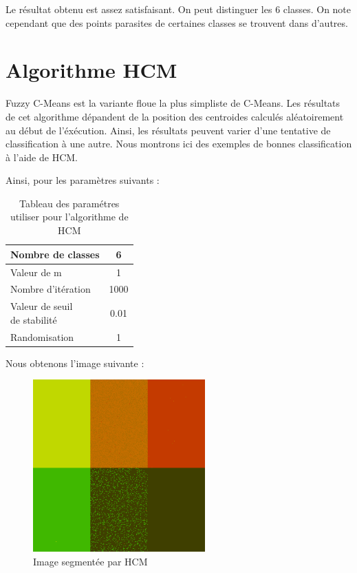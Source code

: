 \documentclass[a4paper,11pt]{article}
\begin{document}
Le résultat obtenu est assez satisfaisant. On peut distinguer les 6 classes. On note cependant que des points parasites de certaines classes se trouvent dans d'autres.

\section{Algorithme HCM}
Fuzzy C-Means est la variante floue la plus simpliste de C-Means. Les résultats de cet algorithme dépandent de la position des centroides calculés aléatoirement au début de l'éxécution. Ainsi, les résultats peuvent varier d'une tentative de classification à une autre. Nous montrons ici des exemples de bonnes classification à l'aide de HCM.

Ainsi, pour les paramètres suivants : 

\begin{table}[H]
  \begin{center}
    \begin{tabular}{|l|c|}
      \hline
      Nombre de classes & 6 \\
      \hline
      Valeur de m & 1 \\
      \hline
      Nombre d'itération & 1000 \\
      \hline
      \shortstack{ Valeur de seuil \\ de stabilité }  & 0.01 \\
      \hline
      Randomisation & 1 \\
      \hline
    \end{tabular}
    \caption{Tableau des paramétres utiliser pour l'algorithme de HCM}
  \end{center}
\end{table}

Nous obtenons l'image suivante :

\begin{figure}[H]
\begin{center}
\includegraphics[width=250px]{../img/HCM.png}
\end{center}
\caption{Image segmentée par HCM}
\end{figure}
\end{document}
